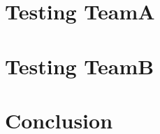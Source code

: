 \documentclass[12pt]{article}
\begin{document}


\newpage
\tableofcontents

\pagebreak

\section{Testing TeamA}



\section{Testing TeamB}



\section{Conclusion}

\end{document}
